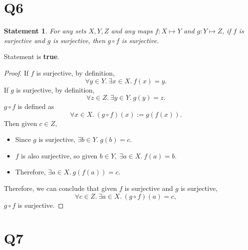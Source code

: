 \documentclass[12pt]{article}
\newtheorem*{stmt}{Statement}
\begin{document}
\section*{Q6}
\begin{stmt}
    For any sets $X,Y,Z$ and any maps $f:X\mapsto Y$ and $g:Y\mapsto Z$,
    if $f$ is surjective and $g$ is surjective, then $g\circ f$ is surjective.
\end{stmt}
Statement is \textbf{true}.
\begin{proof}
    If $f$ is surjective, by definition,
        $$\forall y \in Y.~ \exists x \in X.~ f(x) = y.$$
    If $g$ is surjective, by definition,
        $$\forall z \in Z.~ \exists y \in Y.~ g(y) = z.$$
    $g \circ f$ is defined as
        $$\forall x \in X.~ (g \circ f)(x) := g(f(x)).$$
    Then given $c \in Z$,
    \begin{itemize}[label={}]
        \item Since $g$ is surjective, $\exists b \in Y.~ g(b) = c.$
        \item $f$ is also surjective, so given $b \in Y,~ \exists a \in X.~ f(a) = b.$
        \item Therefore, $\exists a \in X.~ g(f(a)) = c.$
    \end{itemize}
    Therefore, we can conclude that given $f$ is surjective and $g$ is surjective,
        $$\forall c \in Z.~ \exists a \in X.~ (g \circ f)(a) = c,$$
        $g \circ f$ is surjective.
\end{proof}
\newpage

\section*{Q7}
\end{document}
